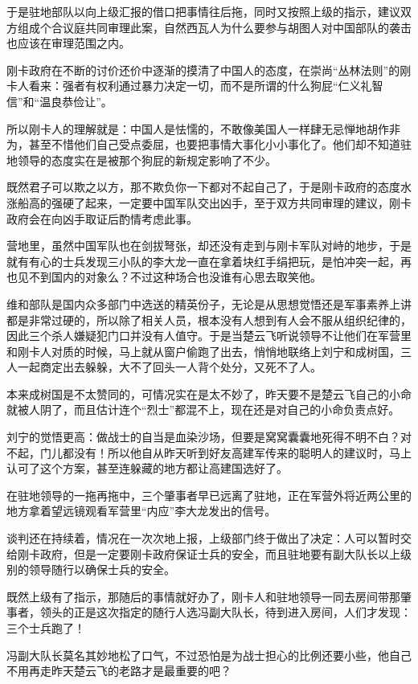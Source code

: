 于是驻地部队以向上级汇报的借口把事情往后拖，同时又按照上级的指示，建议双方组成个合议庭共同审理此案，自然西瓦人为什么要参与胡图人对中国部队的袭击也应该在审理范围之内。

刚卡政府在不断的讨价还价中逐渐的摸清了中国人的态度，在崇尚“丛林法则”的刚卡人看来：强者有权利通过暴力决定一切，而不是所谓的什么狗屁“仁义礼智信”和“温良恭俭让”。

所以刚卡人的理解就是：中国人是怯懦的，不敢像美国人一样肆无忌惮地胡作非为，甚至不惜他们自己受点委屈，也要把事情大事化小小事化了。他们却不知道驻地领导的态度实在是被那个狗屁的新规定影响了不少。

既然君子可以欺之以方，那不欺负你一下都对不起自己了，于是刚卡政府的态度水涨船高的强硬了起来，一定要中国军队交出凶手，至于双方共同审理的建议，刚卡政府会在向凶手取证后酌情考虑此事。

营地里，虽然中国军队也在剑拔弩张，却还没有走到与刚卡军队对峙的地步，于是就有有心的士兵发现三小队的李大龙一直在拿着块红手绢把玩，是怕冲突一起，再也见不到国内的对象么？不过这种场合也没谁有心思去取笑他。

维和部队是国内众多部门中选送的精英份子，无论是从思想觉悟还是军事素养上讲都是非常过硬的，所以除了相关人员，根本没有人想到有人会不服从组织纪律的，因此三个杀人嫌疑犯门口并没有人值守。于是当楚云飞听说领导不让他们在军营里和刚卡人对质的时候，马上就从窗户偷跑了出去，悄悄地联络上刘宁和成树国，三人一起商定出去躲躲，大不了回头一人背个处分，又死不了人。

本来成树国是不太赞同的，可情况实在是太不妙了，昨天要不是楚云飞自己的小命就被人阴了，而且估计连个“烈士”都混不上，现在还是对自己的小命负责点好。

刘宁的觉悟更高：做战士的自当是血染沙场，但要是窝窝囊囊地死得不明不白？对不起，门儿都没有！所以他自从昨天听到好友高建军传来的聪明人的建议时，马上认可了这个方案，甚至连躲藏的地方都让高建国选好了。

在驻地领导的一拖再拖中，三个肇事者早已远离了驻地，正在军营外将近两公里的地方拿着望远镜观看军营里“内应”李大龙发出的信号。

谈判还在持续着，情况在一次次地上报，上级部门终于做出了决定：人可以暂时交给刚卡政府，但是一定要刚卡政府保证士兵的安全，而且驻地要有副大队长以上级别的领导随行以确保士兵的安全。

既然上级有了指示，那随后的事情就好办了，刚卡人和驻地领导一同去房间带那肇事者，领头的正是这次指定的随行人选冯副大队长，待到进入房间，人们才发现：三个士兵跑了！

冯副大队长莫名其妙地松了口气，不过恐怕是为战士担心的比例还要小些，他自己不用再走昨天楚云飞的老路才是最重要的吧？

